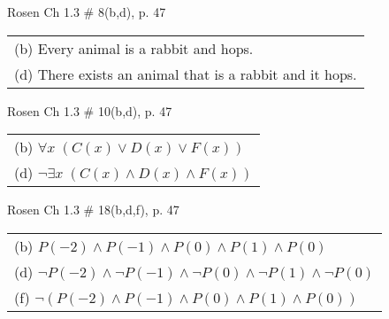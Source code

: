 \documentclass[12pt]{exam}
\begin{document}
\begin{questions}
\question Rosen Ch 1.3 \# 8(b,d), p. 47
    \begin{solution}
    \begin{tabular}{l}
        (b) Every animal is a rabbit and hops. \\
        (d) There exists an animal that is a rabbit and it hops. \\
    \end{tabular}
    \end{solution}

\question Rosen Ch 1.3 \# 10(b,d), p. 47
    \begin{solution}
    \begin{tabular}{l}
    (b) $\forall x\; (C(x) \vee D(x) \vee F(x))$ \\
    (d) $\neg \exists x\; (C(x) \wedge D(x) \wedge F(x))$ \\
    \end{tabular}
    \end{solution}

\question Rosen Ch 1.3 \# 18(b,d,f), p. 47
    \begin{solution}
    \begin{tabular}{l}
    (b) $P(-2) \wedge P(-1) \wedge P(0) \wedge P(1) \wedge P(0)$ \\
    (d) $\neg P(-2) \wedge \neg P(-1) \wedge \neg P(0) \wedge \neg P(1) \wedge \neg P(0)$ \\
    (f) $\neg ( P(-2) \wedge P(-1) \wedge P(0) \wedge P(1) \wedge P(0) )$ \\
    \end{tabular}
    \end{solution}

\end{questions}
\end{document}
